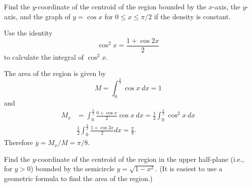 \documentclass{ximera}
\begin{document}
\begin{question}%

Find the \(y\)-coordinate of the centroid of the region bounded by the \(x\)-axis, the \(y\)-axis, and the graph of \(y = \cos x\) for \(0 \leq x \leq \pi/2\) if the density is constant.
\begin{hint}
Use the identity \[ \cos^2 x  = \frac{1 + \cos 2x}{2} \]
to calculate the integral of $\cos^2 x$.
\end{hint}
\begin{multiplechoice}
\end{multiplechoice}
\begin{feedback}
The area of the region is given by
\[ M = \int_0^{\frac{\pi}{2}} \cos x~dx = 1 \]
and 
\[\begin{aligned}
 M_x & = \int_0^{\frac{\pi}{2}} \frac{0 + \cos x}{2} \cos x~ dx = \frac{1}{2} \int_0^{\frac{\pi}{2}} \cos^2 x ~ dx \\
& \frac{1}{2} \int_0^{\frac{\pi}{2}} \frac{1 + \cos 2x}{2} dx = \frac{\pi}{8}. 
\end{aligned}\]
Therefore \(\overline{y} = M_x / M = \pi/8\).
\end{feedback}

\end{question}

\begin{question}%

Find the \(y\)-coordinate of the centroid of the region in the upper half-plane (i.e., for \(y > 0\)) bounded by the semicircle \(y = \sqrt{1-x^2}\). (It is easiest to use a geometric formula to find the area of the region.)
\begin{multiplechoice}
\end{multiplechoice}

\end{question}
\end{document}
